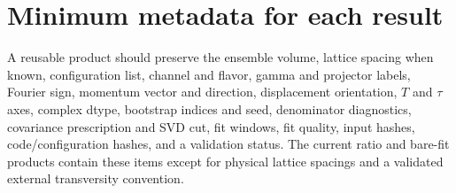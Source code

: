 \documentclass[11pt]{article}
\numberwithin{equation}{section}
\begin{document}
\section{Minimum metadata for each result}

A reusable product should preserve the ensemble volume, lattice spacing when
known, configuration list, channel and flavor, gamma and projector labels,
Fourier sign, momentum vector and direction, displacement orientation,
$T$ and $\tau$ axes, complex dtype, bootstrap indices and seed, denominator
diagnostics, covariance prescription and SVD cut, fit windows, fit quality,
input hashes, code/configuration hashes, and a validation status.  The current
ratio and bare-fit products contain these items except for physical lattice
spacings and a validated external transversity convention.



\end{document}
